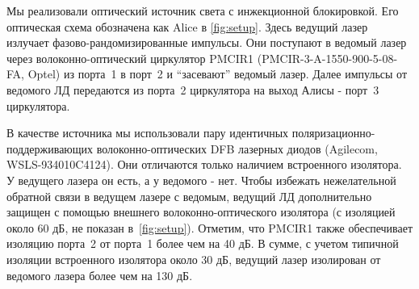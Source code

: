 Мы реализовали оптический источник света с инжекционной блокировкой. Его оптическая схема обозначена как Alice в \cref{fig:setup}. Здесь ведущий лазер излучает фазово-рандомизированные импульсы. Они поступают в ведомый лазер через волоконно-оптический циркулятор PMCIR1 (PMCIR-3-A-1550-900-5-08-FA, Optel) из порта~1 в порт~2 и ``засевают'' ведомый лазер. Далее импульсы от ведомого ЛД передаются из порта~2 циркулятора на выход Алисы - порт~3 циркулятора.

В качестве источника мы использовали пару идентичных поляризационно-поддерживающих волоконно-оптических DFB лазерных диодов (Agilecom, WSLS-934010C4124). Они отличаются только наличием встроенного изолятора. У ведущего лазера он есть, а у ведомого - нет. Чтобы избежать нежелательной обратной связи в ведущем лазере с ведомым, ведущий ЛД дополнительно защищен с помощью внешнего волоконно-оптического изолятора (с изоляцией около 60 дБ, не показан в~\cref{fig:setup}). Отметим, что PMCIR1 также обеспечивает изоляцию порта~2 от порта~1 более чем на 40 дБ. В сумме, с учетом типичной изоляции встроенного изолятора около 30 дБ, ведущий лазер изолирован от ведомого лазера более чем на 130 дБ.
 
